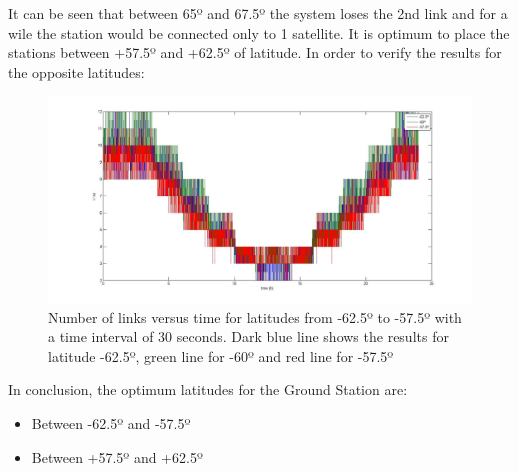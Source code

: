 It can be seen that between 65º and 67.5º the system loses the 2nd link and for a wile the station would be connected only to 1 satellite. It is optimum to place the stations between +57.5º and +62.5º of latitude. In order to verify the results for the opposite latitudes:
\begin{figure}[H]
\begin{center}
\includegraphics[scale=0.30]{-625_-25_575_(30s)_lat.jpg}
\caption[Links vs time for latitudes from -62.5º to -57.5º reduced timestep]{Number of links versus time for latitudes from -62.5º to -57.5º with a time interval of 30 seconds. Dark blue line shows the results for latitude -62.5º, green line for -60º and red line for -57.5º}
\label{fig:lat8}
\end{center}
\end{figure}
In conclusion, the optimum latitudes for the Ground Station are:
\begin{itemize}
\item Between -62.5º and -57.5º
\item Between +57.5º and +62.5º
\end{itemize}


